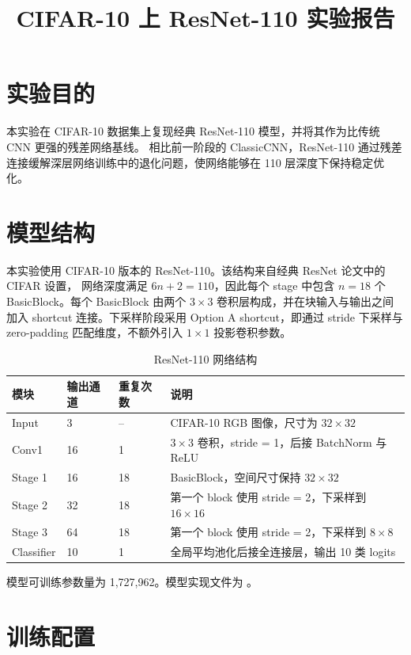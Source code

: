 \documentclass[UTF8]{ctexart}
\title{CIFAR-10 上 ResNet-110 实验报告}
\author{}
\date{}
\begin{document}
\maketitle

\section{实验目的}

本实验在 CIFAR-10 数据集上复现经典 ResNet-110 模型，并将其作为比传统 CNN 更强的残差网络基线。
相比前一阶段的 ClassicCNN，ResNet-110 通过残差连接缓解深层网络训练中的退化问题，使网络能够在
110 层深度下保持稳定优化。

\section{模型结构}

本实验使用 CIFAR-10 版本的 ResNet-110。该结构来自经典 ResNet 论文中的 CIFAR 设置，
网络深度满足 $6n+2=110$，因此每个 stage 中包含 $n=18$ 个 BasicBlock。每个 BasicBlock
由两个 $3\times3$ 卷积层构成，并在块输入与输出之间加入 shortcut 连接。下采样阶段采用
Option A shortcut，即通过 stride 下采样与 zero-padding 匹配维度，不额外引入 $1\times1$
投影卷积参数。

\begin{table}[H]
    \centering
    \caption{ResNet-110 网络结构}
    \begin{tabularx}{\textwidth}{lllY}
        \toprule
        模块 & 输出通道 & 重复次数 & 说明 \\
        \midrule
        Input & 3 & -- & CIFAR-10 RGB 图像，尺寸为 $32\times32$ \\
        Conv1 & 16 & 1 & $3\times3$ 卷积，stride = 1，后接 BatchNorm 与 ReLU \\
        Stage 1 & 16 & 18 & BasicBlock，空间尺寸保持 $32\times32$ \\
        Stage 2 & 32 & 18 & 第一个 block 使用 stride = 2，下采样到 $16\times16$ \\
        Stage 3 & 64 & 18 & 第一个 block 使用 stride = 2，下采样到 $8\times8$ \\
        Classifier & 10 & 1 & 全局平均池化后接全连接层，输出 10 类 logits \\
        \bottomrule
    \end{tabularx}
\end{table}

模型可训练参数量为 1,727,962。模型实现文件为 。

\section{训练配置}
\end{document}
